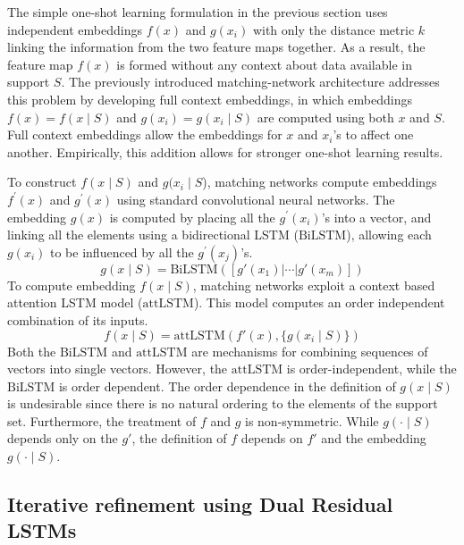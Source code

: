 \documentclass[journal=jacsat,manuscript=article]{achemso}
\begin{document}
The simple one-shot learning formulation in the previous section uses independent embeddings $f(x)$ and $g(x_i)$ with only the distance metric $k$ linking the information from the two feature maps together. As a result, the feature map $f(x)$ is formed without any context about data available in support $S$. The previously introduced matching-network architecture \cite{vinyals2016matching} addresses this problem by developing full context embeddings, in which embeddings $f(x)=f(x\mid S)$ and $g(x_i)=g(x_i\mid S)$ are computed using both $x$ and $S$. Full context embeddings allow the embeddings for $x$ and $x_i$'s to affect one another. Empirically, this addition allows for stronger one-shot learning results.

To construct $f(x\mid S)$ and $g(x_i\mid S$), matching networks\cite{vinyals2016matching} compute embeddings $f^\prime(x)$ and $g^\prime(x)$ using standard convolutional neural networks. The embedding $g(x)$ is computed by placing all the $g^\prime(x_i)$'s into a vector, and linking all the elements using a bidirectional LSTM \cite{hochreiter1997long, graves2013hybrid} ($\text{BiLSTM}$), allowing each $g(x_i)$ to be influenced by all the $g^\prime(x_j)$'s. 
\[
g(x\mid S) =\text{BiLSTM}([g'(x_1)|\cdots|g'(x_m)])
\]
To compute embedding $f(x\mid S)$, matching networks exploit a context based attention LSTM model \cite{vinyals2015order} ($\text{attLSTM}$). This model computes an order independent combination of its inputs.
\[
f(x\mid S) = \text{attLSTM}(f'(x), \{g(x_i\mid S)\})
\]
Both the $\text{BiLSTM}$ and $\text{attLSTM}$ are mechanisms for combining sequences of vectors into single vectors. However, the $\text{attLSTM}$ is order-independent, while the $\text{BiLSTM}$ is order dependent. The order dependence in the definition of $g(x\mid S)$ is undesirable since there is no natural ordering to the elements of the support set. Furthermore, the treatment of $f$ and $g$ is non-symmetric. While $g(\cdot \mid S)$ depends only on the $g'$, the definition of $f$ depends on $f'$ and the embedding $g(\cdot \mid S)$. %




\subsection{Iterative refinement using Dual Residual LSTMs}
\end{document}
